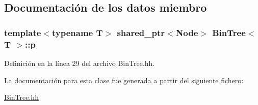 \subsection{Documentación de los datos miembro}
\subsubsection[{\texorpdfstring{p}{p}}]{\setlength{\rightskip}{0pt plus 5cm}template$<$typename T$>$ shared\+\_\+ptr$<${\bf Node}$>$ {\bf Bin\+Tree}$<$ T $>$\+::p\hspace{0.3cm}{\ttfamily [private]}}\hypertarget{class_bin_tree_afe3647af1dda90f6ddf1deee6560fcf1}{}\label{class_bin_tree_afe3647af1dda90f6ddf1deee6560fcf1}


Definición en la línea 29 del archivo Bin\+Tree.\+hh.



La documentación para esta clase fue generada a partir del siguiente fichero\+:\begin{DoxyCompactItemize}
\item 
\hyperlink{_bin_tree_8hh}{Bin\+Tree.\+hh}\end{DoxyCompactItemize}
